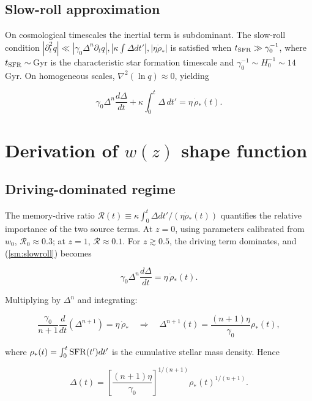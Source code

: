 \documentclass[12pt,a4paper]{article}
\begin{document}
\subsection{Slow-roll approximation}

On cosmological timescales the inertial term is subdominant. The slow-roll condition $|\partial_t^2 q|\ll|\gamma_0\Delta^n\partial_t q|,|\kappa\int\Delta dt'|,|\eta\dot{\rho}_*|$ is satisfied when $t_{\rm SFR}\gg\gamma_0^{-1}$, where $t_{\rm SFR}\sim$\,Gyr is the characteristic star formation timescale and $\gamma_0^{-1}\sim H_0^{-1}\sim14$\,Gyr. On homogeneous scales, $\nabla^2(\ln q)\approx0$, yielding

\begin{equation}\label{sm:slowroll}
\boxed{\gamma_0\Delta^n\frac{d\Delta}{dt} + \kappa\int_0^t\Delta\,dt' = \eta\,\dot{\rho}_*(t)}.
\end{equation}

\section{Derivation of $w(z)$ shape function}

\subsection{Driving-dominated regime}

The memory-drive ratio $\mathcal{R}(t)\equiv\kappa\int_0^t\Delta dt'/(\eta\dot{\rho}_*(t))$ quantifies the relative importance of the two source terms. At $z=0$, using parameters calibrated from $w_0$, $\mathcal{R}_0\approx0.3$; at $z=1$, $\mathcal{R}\approx0.1$. For $z\gtrsim0.5$, the driving term dominates, and (\ref{sm:slowroll}) becomes

\begin{equation}
\gamma_0\Delta^n\frac{d\Delta}{dt} = \eta\,\dot{\rho}_*(t).
\end{equation}

Multiplying by $\Delta^n$ and integrating:

\begin{equation}
\frac{\gamma_0}{n+1}\frac{d}{dt}(\Delta^{n+1}) = \eta\,\dot{\rho}_* \quad\Rightarrow\quad \Delta^{n+1}(t) = \frac{(n+1)\eta}{\gamma_0}\rho_*(t),
\end{equation}

where $\rho_*(t)=\int_0^t{\rm SFR}(t')dt'$ is the cumulative stellar mass density. Hence

\begin{equation}\label{sm:delta}
\boxed{\Delta(t) = \left[\frac{(n+1)\eta}{\gamma_0}\right]^{1/(n+1)}\rho_*(t)^{1/(n+1)}}.
\end{equation}
\end{document}
